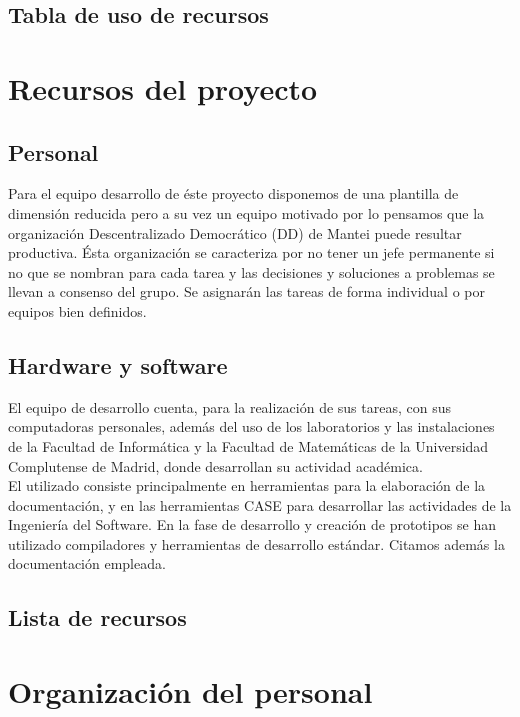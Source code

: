\documentclass[11pt, a4paper, twoside, titlepage]{article}
\begin{document}
		\subsection{Tabla de uso de recursos}
	\section{Recursos del proyecto}
		\subsection{Personal}
			Para el equipo desarrollo de éste proyecto disponemos de una plantilla de dimensión reducida pero a su vez un equipo motivado por lo pensamos que la organización Descentralizado Democrático (DD) de Mantei puede resultar productiva. Ésta organización se caracteriza por no tener un jefe permanente si no que se nombran para cada tarea y las decisiones y soluciones a problemas se llevan a consenso del grupo. Se asignarán las tareas de forma individual o por equipos bien definidos.

		\subsection{Hardware y software}
			El equipo de desarrollo cuenta, para la realización de sus tareas, con sus computadoras personales, además del uso de los laboratorios y las instalaciones de la Facultad de Informática y la Facultad de Matemáticas de la Universidad Complutense de Madrid, donde desarrollan su actividad académica.\\

			El \software utilizado consiste principalmente en herramientas para la elaboración de la documentación, y en las herramientas CASE para desarrollar las actividades de la Ingeniería del Software. En la fase de desarrollo y creación de prototipos se han utilizado compiladores y herramientas de desarrollo estándar. Citamos además la documentación empleada.

		\subsection{Lista de recursos}
			

	\section{Organización del personal}
\end{document}
